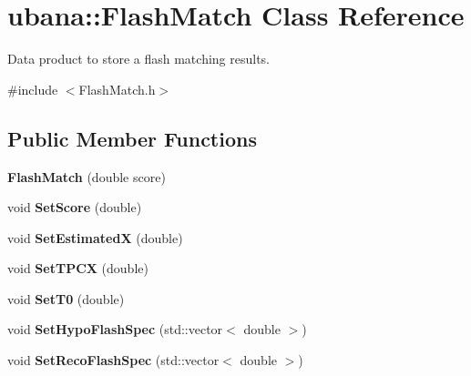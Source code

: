 \hypertarget{classubana_1_1FlashMatch}{\section{ubana\-:\-:Flash\-Match Class Reference}
\label{classubana_1_1FlashMatch}
}


Data product to store a flash matching results.  




{\ttfamily \#include $<$Flash\-Match.\-h$>$}

\subsection*{Public Member Functions}
\begin{DoxyCompactItemize}
\item 
\hypertarget{classubana_1_1FlashMatch_ac6dac027acf7a820fed8b77b79983eef}{{\bfseries Flash\-Match} (double score)}\label{classubana_1_1FlashMatch_ac6dac027acf7a820fed8b77b79983eef}

\item 
\hypertarget{classubana_1_1FlashMatch_a914461ed5856c4dd6efd4b802a99e694}{void {\bfseries Set\-Score} (double)}\label{classubana_1_1FlashMatch_a914461ed5856c4dd6efd4b802a99e694}

\item 
\hypertarget{classubana_1_1FlashMatch_a75b780b23d3f90bbd87d92e13c2a9d65}{void {\bfseries Set\-Estimated\-X} (double)}\label{classubana_1_1FlashMatch_a75b780b23d3f90bbd87d92e13c2a9d65}

\item 
\hypertarget{classubana_1_1FlashMatch_ae68bce2f79738dbc0867f3fb76277f7c}{void {\bfseries Set\-T\-P\-C\-X} (double)}\label{classubana_1_1FlashMatch_ae68bce2f79738dbc0867f3fb76277f7c}

\item 
\hypertarget{classubana_1_1FlashMatch_a377ea80205d325f2605a341379fe2539}{void {\bfseries Set\-T0} (double)}\label{classubana_1_1FlashMatch_a377ea80205d325f2605a341379fe2539}

\item 
\hypertarget{classubana_1_1FlashMatch_aee49ac7698634e3e59b8b489dd6cc993}{void {\bfseries Set\-Hypo\-Flash\-Spec} (std\-::vector$<$ double $>$)}\label{classubana_1_1FlashMatch_aee49ac7698634e3e59b8b489dd6cc993}

\item 
\hypertarget{classubana_1_1FlashMatch_a1d5970b7af75cc887dba190af9388ae5}{void {\bfseries Set\-Reco\-Flash\-Spec} (std\-::vector$<$ double $>$)}\label{classubana_1_1FlashMatch_a1d5970b7af75cc887dba190af9388ae5}


\end{DoxyCompactItemize}
